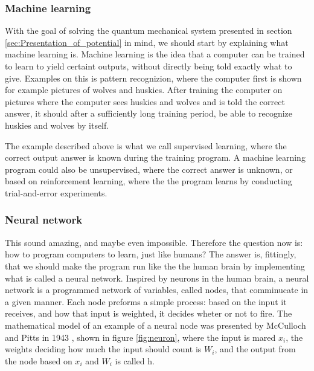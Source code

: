 \documentclass[norsk,a4paper,12pt]{article}
\begin{document}
\subsubsection{Machine learning}
With the goal of solving the quantum mechanical system presented in section \ref{sec:Presentation_of_potential} in mind, we should start by explaining what machine learning is. Machine learning is the idea that a computer can be trained to learn to yield certaint outputs, without directly being told exactly what to give. Examples on this is pattern recognizion, where the computer first is shown for example pictures of wolves and huskies. After training the computer on pictures where the computer sees huskies and wolves and is told the correct answer, it should after a sufficiently long training period, be able to recognize huskies and wolves by itself. 
\par 
\vspace{3mm}
The example described above is what we call supervised learning, where the correct output answer is known during the training program. A machine learning program could also be unsupervised, where the correct answer is unknown, or based on reinforcement learning, where the the program learns by conducting trial-and-error experiments. 
\par 
\vspace{3mm}

\subsubsection{Neural network}

 This sound amazing, and maybe even impossible. Therefore the question now is: how to program computers to learn, just like humans? The answer is, fittingly, that we should make the program run like the the human brain by implementing what is called a neural network. Inspired by neurons in the human brain, a neural network is a programmed network of variables, called nodes, that comminucate in a given manner. Each node preforms a simple process: based on the input it receives, and how that input is weighted, it decides wheter or not to fire. The mathematical model of an example of a neural node was presented by McCulloch and Pitts in 1943 \cite{Marsland}, shown in figure \ref{fig:neuron}, where the input is mared $x_i$, the weights deciding how much the input should count is $W_i$, and the output from the node based on $x_i$ and $W_i$ is called h. 
 
\end{document}

